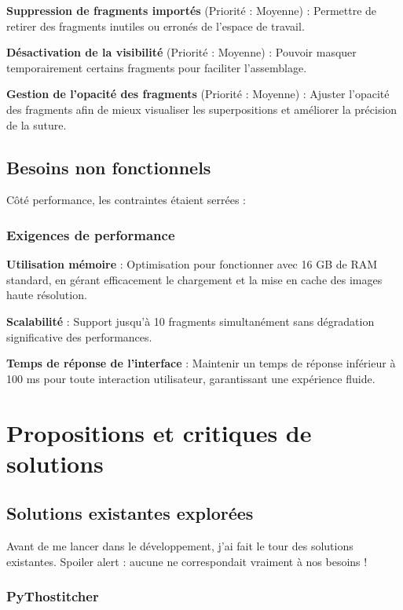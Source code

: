 \documentclass[11pt,a4paper]{report}
\begin{document}
\textbf{Suppression de fragments importés} (Priorité : Moyenne) : Permettre de retirer des fragments inutiles ou erronés de l'espace de travail.

\textbf{Désactivation de la visibilité} (Priorité : Moyenne) : Pouvoir masquer temporairement certains fragments pour faciliter l'assemblage.

\textbf{Gestion de l'opacité des fragments} (Priorité : Moyenne) : Ajuster l'opacité des fragments afin de mieux visualiser les superpositions et améliorer la précision de la suture.

\subsection{Besoins non fonctionnels}

Côté performance, les contraintes étaient serrées :

\subsubsection{Exigences de performance}

\textbf{Utilisation mémoire} : Optimisation pour fonctionner avec 16 GB de RAM standard, en gérant efficacement le chargement et la mise en cache des images haute résolution.

\textbf{Scalabilité} : Support jusqu'à 10 fragments simultanément sans dégradation significative des performances.

\textbf{Temps de réponse de l'interface} : Maintenir un temps de réponse inférieur à 100 ms pour toute interaction utilisateur, garantissant une expérience fluide.

\section{Propositions et critiques de solutions}

\subsection{Solutions existantes explorées}

Avant de me lancer dans le développement, j'ai fait le tour des solutions existantes. Spoiler alert : aucune ne correspondait vraiment à nos besoins !

\subsubsection{PyThostitcher}
\end{document}
